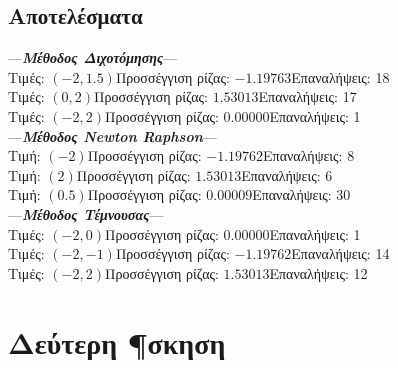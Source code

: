 \documentclass[a4paper,11pt]{article}
\newcommand{\lt}{\latintext}
\newcommand{\gt}{\greektext}
\begin{document}
\begin{flushleft}
\begin{itemize}
	\subsection{Αποτελέσματα}
\medskip 
---\emph{\textbf{Μέθοδος Διχοτόμησης}}---\\
Τιμές: $(-2, 1.5)$\quad   Προσσέγγιση ρίζας: $-1.19763$\quad Επαναλήψεις: 18\\
Τιμές: $(0, 2)$\quad Προσσέγγιση ρίζας: $1.53013$\quad Επαναλήψεις: 17\\
Τιμές: $(-2, 2)$\quad Προσσέγγιση ρίζας: $0.00000$\quad Επαναλήψεις: 1\\
\bigskip 
---\emph{\textbf{Μέθοδος \lt Newton Raphson\gt}}---\\
Τιμή: $(-2)$\quad      Προσσέγγιση ρίζας: $-1.19762$\quad 	Επαναλήψεις: 8\\
Τιμή: $(2)$\quad	  Προσσέγγιση ρίζας: $1.53013$\quad 	Επαναλήψεις: 6\\
Τιμή: $(0.5)$\quad	  Προσσέγγιση ρίζας: $0.00009$\quad 	Επαναλήψεις: 30\\
\bigskip 
---\emph{\textbf{Μέθοδος Τέμνουσας}}---\\
Τιμές: $(-2, 0)$\quad		 Προσσέγγιση ρίζας: $0.00000$\quad 	Επαναλήψεις: 1\\
Τιμές: $(-2, -1)$\quad		 Προσσέγγιση ρίζας: $-1.19762$\quad 	Επαναλήψεις: 14\\
Τιμές: $(-2, 2)$\quad		 Προσσέγγιση ρίζας: $1.53013$\quad 	Επαναλήψεις: 12\\

	\end{itemize}
	\end{flushleft}

\pagebreak


\section{Δεύτερη ¶σκηση}
\end{document}
